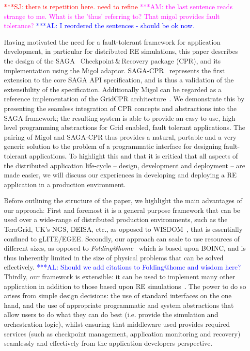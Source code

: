 \documentclass{rspublic}
\newcommand{\alnote}[1]{ {\textcolor{blue} { ***AL: #1 }}}
\newcommand{\amnote}[1]{ {\textcolor{magenta} { ***AM: #1 }}}
\newcommand{\jhanote}[1]{ {\textcolor{red} { ***SJ: #1 }}}
\newcommand{\alnote}[1]{}
\newcommand{\amnote}[1]{}
\newcommand{\jhanote}[1]{}
\begin{document}
\jhanote{there is repetition here. need to refine} \amnote{the last
  sentence reads strange to me.  What is the 'thus' referring to?  That
  migol provides fault tolerance?}      
\alnote{I reordered the sentences - should be ok now.}

Having motivated the need for a fault-tolerant framework for
application development, in particular for distributed RE simulations,
this paper describes the design of the SAGA~\citep{saga_gfd90}
Checkpoint\,\&\,Recovery package (CPR), and its implementation using
the Migol adaptor. SAGA-CPR~\citep{saga-cpr} represents the first
extension to the core SAGA API specification, and is thus a validation
of the extensibility of the specification.  Additionally Migol can be
regarded as a reference implementation of the GridCPR
architecture~\citep{ogf_cpr_arch}.  We demonstrate this by presenting
the seamless integration of CPR concepts and abstractions into the
SAGA framework; the resulting system is able to provide an easy to
use, high-level programming abstractions for Grid enabled, fault
tolerant applications.  The pairing of Migol and SAGA-CPR thus
provides a natural, portable and a very generic solution to the
problem of a programmatic interface for designing fault-tolerant
applications.  To highlight this and that it is critical that all
aspects of the distributed application life-cycle -- design,
development and deployment -- are made easier, we will discuss our
experiences in developing and deploying a RE application in a
production environment.


Before outlining the structure of the paper, we highlight the main
advantages of our approach: First and foremost it is a general purpose
framework that can be used over a wide-range of distributed production
environments, such as the TeraGrid, UK's NGS, DEISA, etc., as opposed
to WISDOM~\citep{wisdom}, that is essentially confined to
gLITE/EGEE. Secondly, our approach can scale to use resources of
different sizes, as opposed to {\it Folding@home}~\citep{folding} which
is based upon BOINC, and is thus inherently limited in the size of
physical problems that can be solved effectively.  \alnote{Should we
  add citations to Folding@home and wisdom here?}  Thirdly, our
framework is extensible: it can be used to implement many other
application in addition to those based upon RE
simulations~\citep{escience07}. The power to do so arises
from simple design decisions: the use of standard interfaces on the
one hand, and the use of appropriate programmatic and system
abstractions that allow users to do what they can do best
(i.e. provide the simulation and orchestration logic), whilst ensuring
that middleware used provides required services (such as checkpoint
management, application monitoring and recovery) seamlessly and
effectively from the application developers perspective.
\end{document}
